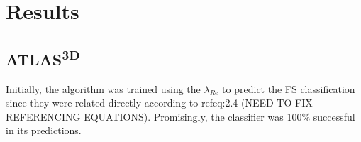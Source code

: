\chapter{Results}

\label{ch:results}

\section{ATLAS\textsuperscript{3D}}
Initially, the algorithm was trained using the $\lambda_{Re}$ to predict the FS classification since they were related directly according to ref{eq:2.4}
(NEED TO FIX REFERENCING EQUATIONS). Promisingly, the classifier was 100\% successful in its predictions. 